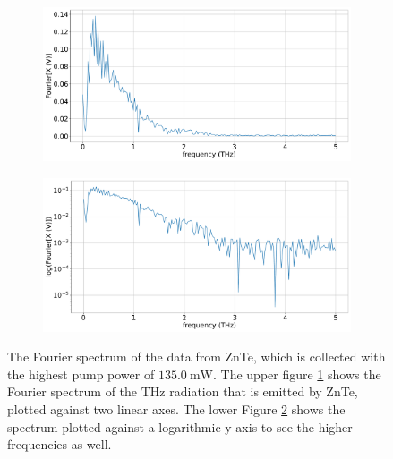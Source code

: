 \begin{figure}%
    \centering
    \begin{subfigure}{.55\textwidth}%
        \centering
        \includegraphics[width=\textwidth]{Plots/2_11_30_20normalFX.pdf}%
        \label{fig:2_11_30_20_fft}%
    \end{subfigure}%
    \hfill%
    \begin{subfigure}{.55\textwidth}%
        \centering
        \includegraphics[width=\textwidth]{Plots/2_11_30_20normallog(FX).pdf}%
        \label{fig:2_11_30_20_fft_log}%
    \end{subfigure}%
    \caption{The Fourier spectrum of the data from ZnTe, which is collected with the highest pump power of $\SI{135.0}{\milli\W}$.
    The upper figure \ref{fig:2_11_30_20_fft} shows the Fourier spectrum of the $\si{\tera\hertz}$ radiation that is emitted by ZnTe, plotted against two linear axes.
    The lower Figure \ref{fig:2_11_30_20_fft_log} shows the spectrum plotted against a logarithmic y-axis to see the higher frequencies as well.}%
    \label{fig:fourier_znte}%
\end{figure}\FloatBarrier
